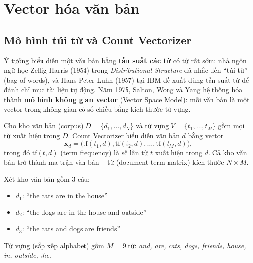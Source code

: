 \section{Vector hóa văn bản}

\subsection{Mô hình túi từ và Count Vectorizer}

Ý tưởng biểu diễn một văn bản bằng \textbf{tần suất các từ} có từ rất sớm: nhà ngôn ngữ học Zellig Harris (1954) trong \textit{Distributional Structure} đã nhắc đến ``túi từ'' (bag of words), và Hans Peter Luhn (1957) tại IBM đề xuất dùng tần suất từ để đánh chỉ mục tài liệu tự động. Năm 1975, Salton, Wong và Yang hệ thống hóa thành \textbf{mô hình không gian vector} (Vector Space Model): mỗi văn bản là một vector trong không gian có số chiều bằng kích thước từ vựng.

\begin{definition}
Cho kho văn bản (corpus) $D = \{d_1, \dots, d_N\}$ và từ vựng $V = \{t_1, \dots, t_M\}$ gồm mọi từ xuất hiện trong $D$. Count Vectorizer biểu diễn văn bản $d$ bằng vector
\begin{equation}
    \mathbf{x}_d = \big(\mathrm{tf}(t_1, d), \mathrm{tf}(t_2, d), \dots, \mathrm{tf}(t_M, d)\big),
\end{equation}
trong đó $\mathrm{tf}(t, d)$ (term frequency) là số lần từ $t$ xuất hiện trong $d$. Cả kho văn bản trở thành ma trận văn bản -- từ (document-term matrix) kích thước $N \times M$.
\end{definition}

\begin{example}
Xét kho văn bản gồm 3 câu:
\begin{itemize}
    \item $d_1$: ``the cats are in the house''
    \item $d_2$: ``the dogs are in the house and outside''
    \item $d_3$: ``the cats and dogs are friends''
\end{itemize}
Từ vựng (sắp xếp alphabet) gồm $M = 9$ từ: \textit{and, are, cats, dogs, friends, house, in, outside, the}.
\end{example}

